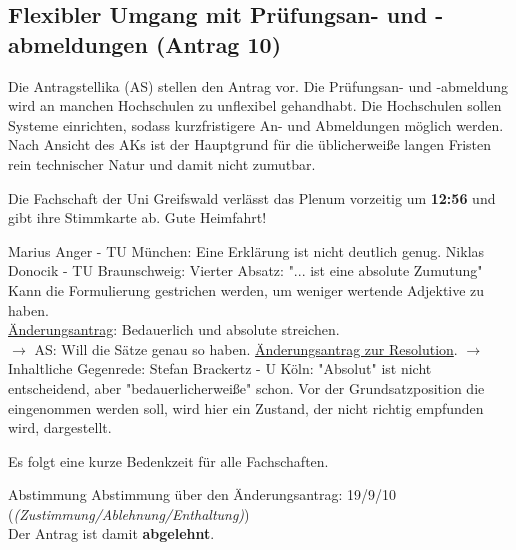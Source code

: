   \subsection{Flexibler Umgang mit Prüfungsan- und -abmeldungen (Antrag 10)}
    Die Antragstellika (AS) stellen den Antrag vor.
    Die Prüfungsan- und -abmeldung wird an manchen Hochschulen zu unflexibel gehandhabt. Die Hochschulen sollen Systeme einrichten, sodass kurzfristigere An- und Abmeldungen möglich werden.
    Nach Ansicht des AKs ist der Hauptgrund für die üblicherweiße langen Fristen rein technischer Natur und damit nicht zumutbar.

    \begin{info}{}
      Die Fachschaft der Uni Greifswald verlässt das Plenum vorzeitig um \textbf{12:56} und gibt ihre Stimmkarte ab. Gute Heimfahrt!
    \end{info}

    \begin{outline}
      \1 Marius Anger - TU München:  Eine Erklärung ist nicht deutlich genug.
      \1 Niklas Donocik - TU Braunschweig:  Vierter Absatz: "... ist eine absolute Zumutung" Kann die Formulierung gestrichen werden, um weniger wertende Adjektive zu haben. \\ \underline{Änderungsantrag}: Bedauerlich und absolute streichen. \\
      $\rightarrow$ AS: Will die Sätze genau so haben.
      \1 \underline{Änderungsantrag zur Resolution}. $\rightarrow$ Inhaltliche Gegenrede:
        Stefan Brackertz - U Köln:  "Absolut" ist nicht entscheidend, aber "bedauerlicherweiße" schon. Vor der Grundsatzposition die eingenommen werden soll, wird hier ein Zustand, der nicht richtig empfunden wird, dargestellt.
    \end{outline}
    Es folgt eine kurze Bedenkzeit für alle Fachschaften.

    \begin{danger}{Abstimmung}
      Abstimmung über den Änderungsantrag: 19/9/10 (\textit{(Zustimmung/Ablehnung/Enthaltung)}) \\
      Der Antrag ist damit \textbf{abgelehnt}.
    \end{danger}

